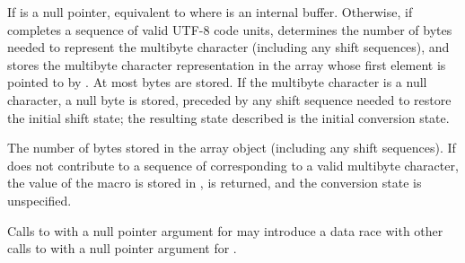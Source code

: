 \begin{itemdescr}
\pnum
\effects
If  is a null pointer, equivalent to
where  is an internal buffer.
%
Otherwise, if  completes a sequence of valid UTF-8 code units,
determines the number of bytes needed
to represent the multibyte character (including any shift sequences),
and stores the multibyte character representation in the array
whose first element is pointed to by .
At most  bytes are stored.
If the multibyte character is a null character, a null byte is stored,
preceded by any shift sequence needed to restore the initial shift state;
the resulting state described is the initial conversion state.

\pnum
\returns
The number of bytes stored in the array object (including any shift sequences).
If  does not contribute to a sequence of 
corresponding to a valid multibyte character,
the value of the macro  is stored in ,
 is returned, and the conversion state is unspecified.

\pnum
\remarks
Calls to  with a null pointer argument for 
may introduce a data race
with other calls to 
with a null pointer argument for .
\end{itemdescr}

